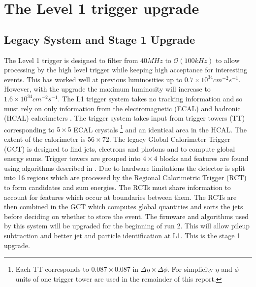 \chapter{The Level 1 trigger upgrade} %

\section{Legacy System and Stage 1 Upgrade}
The Level 1 trigger is designed to filter from $40MHz$ to $\mathcal{O}(100kHz)$ to allow processing
by the high level trigger while keeping high acceptance for interesting events. This has 
worked well at previous luminosities up to $0.7\times10^{34} cm^{-2}s^{-1}$. However, with the 
upgrade the maximum luminosity will increase to $1.6\times10^{34} cm^{-2}s^{-1}$. 
The L1 trigger system takes no tracking information and so must rely on only information 
from the electromagnetic (ECAL) and hadronic (HCAL) calorimeters \cite{gct}. 
The trigger system takes input from  trigger towers (TT) corresponding to $5\times5$ ECAL 
crystals \footnote{Each TT corresponds to $0.087\times0.087$ in $\Delta\eta\times\Delta\phi$. 
For simplicity $\eta$ and $\phi$ units of one trigger tower are used in the remainder of this report.} 
and an identical area in the HCAL. The extent of the calorimeter is $56\times72$. The 
legacy Global Calorimeter Trigger (GCT) is designed to find jets, electrons and photons and to 
compute global energy sums. Trigger towers are grouped into $4\times4$ blocks and features are found 
using algorithms described in \cite{gctalgo}. Due to hardware limitations the detector is split into 16 
regions which are processed by the Regional Calorimetric Trigger (RCT) to form candidates and sum 
energies. The RCTs must share information to account for features which occur at boundaries between 
them. The RCTs are then combined in the GCT which computes global quantities and sorts 
the jets before deciding on whether to store the event. The firmware and algorithms used 
by this system will be upgraded for the beginning of run 2. This will allow 
pileup subtraction and better jet and particle identification at L1. This is the stage 1 
upgrade. 
